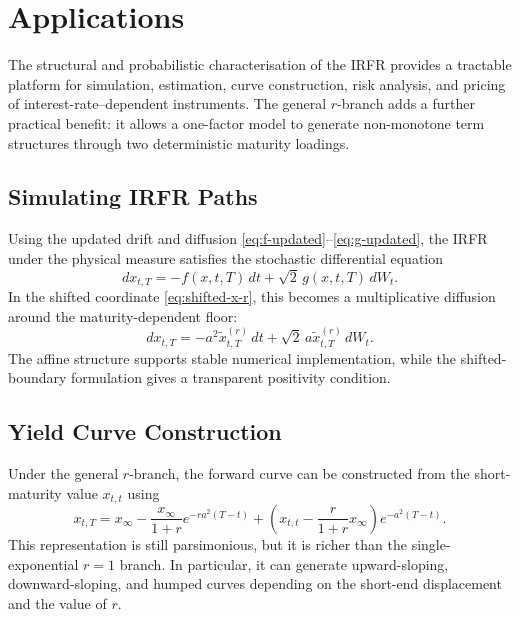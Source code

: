 \documentclass[12pt]{article}
\theoremstyle{statementstyle}
\begin{document}
\section{Applications}
\label{sec:applications}

The structural and probabilistic characterisation of the IRFR provides
a tractable platform for simulation, estimation, curve construction,
risk analysis, and pricing of interest-rate--dependent instruments. The
general \(r\)-branch adds a further practical benefit: it allows a
one-factor model to generate non-monotone term structures through two
deterministic maturity loadings.

\subsection{Simulating IRFR Paths}
\label{subsec:simulation}

Using the updated drift and diffusion
\eqref{eq:f-updated}--\eqref{eq:g-updated}, the IRFR under the physical
measure satisfies the stochastic differential equation
\[
dx_{t,T}
=
-f(x,t,T)\,dt
+
\sqrt{2}\,g(x,t,T)\,dW_{t}.
\]
In the shifted coordinate \eqref{eq:shifted-x-r}, this becomes a
multiplicative diffusion around the maturity-dependent floor:
\[
dx_{t,T}
=
-a^{2}\widetilde{x}_{t,T}^{(r)}\,dt
+
\sqrt{2}\,a\widetilde{x}_{t,T}^{(r)}\,dW_{t}.
\]
The affine structure supports stable numerical implementation, while the
shifted-boundary formulation gives a transparent positivity condition.

\subsection{Yield Curve Construction}
\label{subsec:yield-curve}

Under the general \(r\)-branch, the forward curve can be constructed
from the short-maturity value \(x_{t,t}\) using
\begin{equation}
x_{t,T}
=
x_{\infty}
-
\frac{x_{\infty}}{1+r}e^{-ra^{2}(T-t)}
+
\left(
x_{t,t}
-
\frac{r}{1+r}x_{\infty}
\right)e^{-a^{2}(T-t)}.
\tag{7.2.1}\label{eq:yield-curve-general-r}
\end{equation}
This representation is still parsimonious, but it is richer than the
single-exponential \(r=1\) branch. In particular, it can generate
upward-sloping, downward-sloping, and humped curves depending on the
short-end displacement and the value of \(r\).
\end{document}
